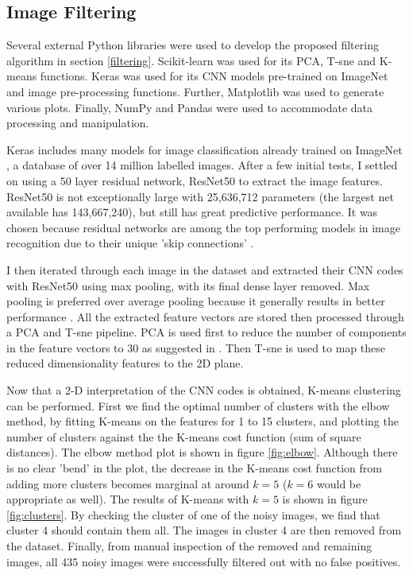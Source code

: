 \documentclass[10pt,twocolumn,letterpaper]{article}
\begin{document}
\subsection{Image Filtering}
\label{image_filter_implementation}

Several external Python libraries were used to develop the proposed filtering algorithm in section \ref{filtering}. Scikit-learn \cite{scikit-learn} was used for its PCA, T-sne and K-means functions. Keras \cite{chollet2015keras} was used for its CNN models pre-trained on ImageNet and image pre-processing functions. Further, Matplotlib \cite{Hunter:2007} was used to generate various plots. Finally, NumPy \cite{numpy} and Pandas \cite{mckinney-proc-scipy-2010} were used to accommodate data processing and manipulation.

Keras includes many models for image classification already trained on ImageNet \cite{imagenet_cvpr09}, a database of over 14 million labelled images. After a few initial tests, I settled on using a 50 layer residual network, ResNet50 \cite{DBLP:journals/corr/HeZRS15} to extract the image features. ResNet50 is not exceptionally large with 25,636,712 parameters (the largest net available has 143,667,240), but still has great predictive performance. It was chosen because residual networks are among the top performing models in image recognition due to their unique 'skip connections' \cite{DBLP:journals/corr/HeZRS15}
.

I then iterated through each image in the dataset and extracted their CNN codes with ResNet50 using max pooling, with its final dense layer removed. Max pooling is preferred over average pooling because it generally results in better performance \cite{karpathy_2018_cnn}. All the extracted feature vectors are stored then processed through a PCA and T-sne pipeline. PCA is used first to reduce the number of components in the feature vectors to 30 as suggested in \cite{maaten2008visualizing}. Then T-sne is used to map these reduced dimensionality features to the 2D plane.

Now that a 2-D interpretation of the CNN codes is obtained, K-means clustering can be performed. First we find the optimal number of clusters with the elbow method, by fitting K-means on the features for 1 to 15 clusters, and plotting the number of clusters against the the K-means cost function (sum of square distances). The elbow method plot is shown in figure \ref{fig:elbow}. Although there is no clear 'bend' in the plot, the decrease in the K-means cost function from adding more clusters becomes marginal at around $k=5$ ($k=6$ would be appropriate as well). The results of K-means with $k=5$ is shown in figure \ref{fig:clusters}. By checking the cluster of one of the noisy images, we find that cluster 4 should contain them all. The images in cluster 4 are then removed from the dataset. Finally, from manual inspection of the removed and remaining images, all 435 noisy images were successfully filtered out with no false positives.
\end{document}
